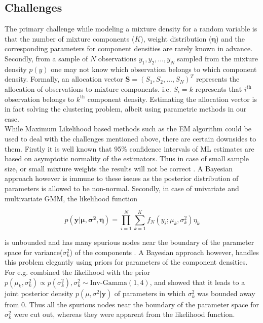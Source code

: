 \subsection{Challenges}
\label{subsec : challenges_mixture_density}
The primary challenge while modeling a mixture density for a random variable is that the number of mixture components ($K$), weight distribution ($\boldsymbol{\eta}$) and the corresponding parameters for component densities are rarely known in advance. Secondly, from a sample of $N$ observations $y_1, y_2, \ldots, y_N$ sampled from the mixture density $p(y)$ one may not know which observation belongs to which component density. Formally, an allocation vector $\boldsymbol{S} = (S_1, S_2, \ldots, S_N)^T$ represents the allocation of observations to mixture components. i.e. $S_i = k$ represents that $i^\text{th}$ observation belongs to $k^\text{th}$ component density. Estimating the allocation vector is in fact solving the clustering problem, albeit using parametric methods in our case.\\

While Maximum Likelihood based methods such as the EM algorithm could be used to deal with the challenges mentioned above, there are certain downsides to them. Firstly it is well known that 95\% confidence intervals of ML estimates are based on asymptotic normality of the estimators. Thus in case of small sample size, or small mixture weights the results will not be correct \citep[pg. 35]{fruhwirth-schnatter_finite_2013}. A Bayesian approach however is immune to these issues as the posterior distribution of parameters is allowed to be non-normal. Secondly, in case of univariate and multivariate GMM, the likelihood function

$$ p(\boldsymbol{y}|\boldsymbol{\mu}, \boldsymbol{\sigma^2}, \boldsymbol{\eta}) = \prod_{i=1}^{N} \sum_{k=1}^{K} f_N(y_i; \mu_k, \sigma^2_k) \eta_k$$

is unbounded and has many spurious nodes near the boundary of the parameter space for variance($\sigma^2_k$) of the components \citep{kiefer_consistency_1956,day_estimating_1969}. A Bayesian approach however, handles this problem elegantly using priors for parameters of the component densities. For e.g. \citet[pg. 176]{fruhwirth-schnatter_finite_2013} combined the likelihood with the prior $p(\mu_k, \sigma^2_k) \propto p(\sigma^2_k), \sigma^2_k\sim \text{Inv-Gamma}(1,4)$, and showed that it leads to a joint posterior density $p(\mu, \sigma^2 | \boldsymbol{y})$ of parameters in which $\sigma^2_k$ was bounded away from 0. Thus all the spurious nodes near the boundary of the parameter space for $\sigma^2_k$ were cut out, whereas they were apparent from the likelihood function.

